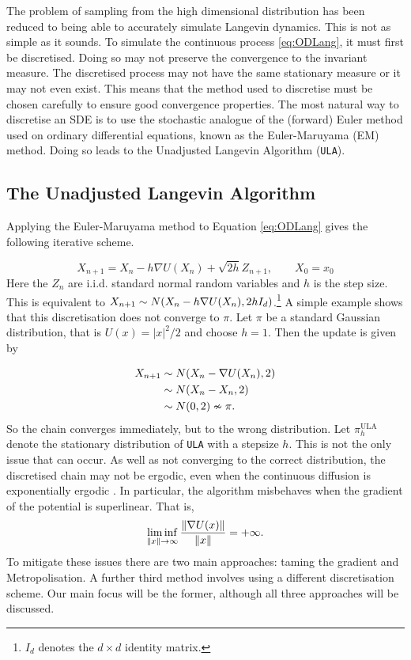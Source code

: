 The problem of sampling from the high dimensional distribution has been reduced to being able to accurately simulate Langevin dynamics. This is not as simple as it sounds. To simulate the continuous process  \eqref{eq:ODLang}, it must first be discretised. Doing so may not preserve the convergence to the invariant measure. The discretised process may not have the same stationary measure or it may not even exist. This means that the method used to discretise must be chosen carefully to ensure good convergence properties. The most natural way to discretise an SDE is to use the stochastic analogue of the (forward) Euler method used on ordinary differential equations, known as the Euler-Maruyama (EM) method. Doing so leads to the Unadjusted Langevin Algorithm (\texttt{ULA}).

\subsection{The Unadjusted Langevin Algorithm}
Applying the Euler-Maruyama method to Equation \eqref{eq:ODLang} gives the following iterative scheme.

\[X_{n+1} = X_n -h \nabla U(X_n) +\sqrt{2h} Z_{n+1},\qquad X_0= x_0 \]
Here the \(Z_n \) are i.i.d. standard normal random variables and \(h\) is the step size. This is equivalent to \(X_{n+1} \sim N(X_n - h\nabla U(X_n), 2h I_d )\).\footnote{\(I_d\) denotes the \(d \times d\) identity matrix.} A simple example shows that this discretisation does not converge to \(\pi\). Let \(\pi\) be a standard Gaussian distribution, that is \(U(x) = |x|^2/2 \) and choose \(h = 1\). Then the update is given by

\begin{align*}
	X_{n+1} &\sim N(X_n - \nabla U(X_n), 2)\\
	& \sim  N(X_n - X_n, 2)\\
	& \sim N(0,2) \nsim \pi .
\end{align*}
So the chain converges immediately, but to the wrong distribution. Let \(\pi^{\text{ULA}}_{h} \) denote the stationary distribution of \texttt{ULA} with a stepsize \(h\). This is not the only issue that can occur. As well as not converging to the correct distribution, the discretised chain may not be  ergodic, even when the continuous diffusion is exponentially ergodic \cite{RT96}. In particular, the algorithm misbehaves when the gradient of the potential is superlinear. That is,
\[\liminf_{\|x\|\to \infty} \frac{\|\nabla U(x)\|}{\|x\|} = +\infty. \]
To mitigate these issues there are two main approaches: taming the gradient and Metropolisation. A further third method involves using a different discretisation scheme.  Our main focus will be the former, although all three approaches will be discussed.

